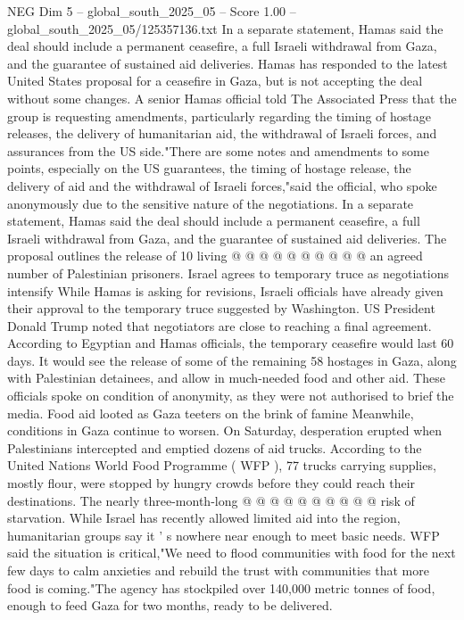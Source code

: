 \begin{textsample}{NEG Dim 5 – global\_south\_2025\_05 – Score 1.00 – global\_south\_2025\_05/125357136.txt}  \label{ex:f5_neg_331}
In a separate statement, Hamas said the deal should include a permanent ceasefire, a full Israeli withdrawal from Gaza, and the guarantee of sustained aid deliveries.
Hamas has responded to the latest United States proposal for a ceasefire in Gaza, but is not accepting the deal without some changes.
A senior Hamas official told The Associated Press that the group is requesting amendments, particularly regarding the timing of hostage releases, the delivery of humanitarian aid, the withdrawal of Israeli forces, and assurances from the US side."There are some notes and amendments to some points, especially on the US guarantees, the timing of hostage release, the delivery of aid and the withdrawal of Israeli forces,"said the official, who spoke anonymously due to the sensitive nature of the negotiations.
In a separate statement, Hamas said the deal should include a permanent ceasefire, a full Israeli withdrawal from Gaza, and the guarantee of sustained aid deliveries.
The proposal outlines the release of 10 living @ @ @ @ @ @ @ @ @ @ an agreed number of Palestinian prisoners.
Israel agrees to temporary truce as negotiations intensify While Hamas is asking for revisions, Israeli officials have already given their approval to the temporary truce suggested by Washington.
US President Donald Trump noted that negotiators are close to reaching a final agreement.
According to Egyptian and Hamas officials, the temporary ceasefire would last 60 days.
It would see the release of some of the remaining 58 hostages in Gaza, along with Palestinian detainees, and allow in much-needed food and other aid.
These officials spoke on condition of anonymity, as they were not authorised to brief the media.
Food aid looted as Gaza teeters on the brink of famine Meanwhile, conditions in Gaza continue to worsen.
On Saturday, desperation erupted when Palestinians intercepted and emptied dozens of aid trucks.
According to the United Nations World Food Programme ( WFP ), 77 trucks carrying supplies, mostly flour, were stopped by hungry crowds before they could reach their destinations.
The nearly three-month-long @ @ @ @ @ @ @ @ @ @ risk of starvation.
While Israel has recently allowed limited aid into the region, humanitarian groups say it ' s nowhere near enough to meet basic needs.
WFP said the situation is critical,"We need to flood communities with food for the next few days to calm anxieties and rebuild the trust with communities that more food is coming."The agency has stockpiled over 140,000 metric tonnes of food, enough to feed Gaza for two months, ready to be delivered.

\end{textsample}
